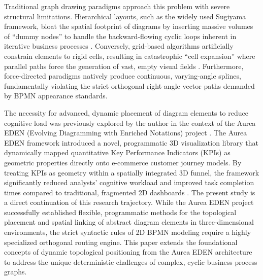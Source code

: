 \documentclass[fleqn,10pt]{wlscirep}
\begin{document}
Traditional graph drawing paradigms approach this problem with severe structural limitations. Hierarchical layouts, such as the widely used Sugiyama framework, bloat the spatial footprint of diagrams by inserting massive volumes of ``dummy nodes'' to handle the backward-flowing cyclic loops inherent in iterative business processes \cite{ref_sugiyama, ref_gansner, ref_brandes}. Conversely, grid-based algorithms artificially constrain elements to rigid cells, resulting in catastrophic ``cell expansion'' where parallel paths force the generation of vast, empty visual fields \cite{ref_kitzmann}. Furthermore, force-directed paradigms natively produce continuous, varying-angle splines, fundamentally violating the strict orthogonal right-angle vector paths demanded by BPMN appearance standards.

The necessity for advanced, dynamic placement of diagram elements to reduce cognitive load was previously explored by the author in the context of the Aurea EDEN (Evolving Diagramming with Enriched Notations) project \cite{ref_waszkowski}. The Aurea EDEN framework introduced a novel, programmatic 3D visualization library that dynamically mapped quantitative Key Performance Indicators (KPIs) as geometric properties directly onto e-commerce customer journey models. By treating KPIs as geometry within a spatially integrated 3D funnel, the framework significantly reduced analysts' cognitive workload and improved task completion times compared to traditional, fragmented 2D dashboards \cite{ref_waszkowski}. The present study is a direct continuation of this research trajectory. While the Aurea EDEN project successfully established flexible, programmatic methods for the topological placement and spatial linking of abstract diagram elements in three-dimensional environments, the strict syntactic rules of 2D BPMN modeling require a highly specialized orthogonal routing engine. This paper extends the foundational concepts of dynamic topological positioning from the Aurea EDEN architecture to address the unique deterministic challenges of complex, cyclic business process graphs.
\end{document}
